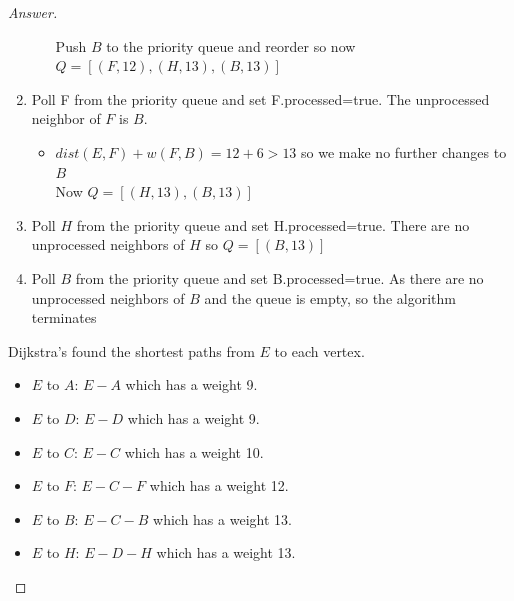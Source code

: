 \documentclass[11pt]{article}
\theoremstyle{definition}
\theoremstyle{definition}
\theoremstyle{definition}
\begin{document}
\begin{proof}[Answer]
\begin{enumerate}
\begin{itemize}
	Push $B$ to the priority queue and reorder so now $Q= [(F,12), (H,13), (B,13)]$
	\end{itemize}
\item Poll F from the priority queue and set F.processed=true. The unprocessed neighbor of $F$ is $B$.
	\begin{itemize}
	\item $dist(E,F) + w({F,B})= 12+6 > 13 $ so we make no further changes to $B$ \\
	Now $Q= [(H,13), (B,13)]$
	\end{itemize}
\item Poll $H$ from the priority queue and set H.processed=true. There are no unprocessed neighbors of $H$ so $Q= [(B,13)]$
\item Poll $B$ from the priority queue and set B.processed=true. As there are no unprocessed neighbors of $B$ and the queue is empty, so the algorithm terminates\\
\end{enumerate}
 Dijkstra's found the shortest paths from $E$ to each vertex.
		\begin{itemize}
		\item $E$ to $A$: $E-A$ which has a weight 9. 
		\item $E$ to $D$: $E-D$ which has a weight 9. 
		\item $E$ to $C$: $E-C$ which has a weight 10. 
		\item $E$ to $F$: $E-C-F$ which has a weight 12. 
		\item $E$ to $B$: $E-C-B$ which has a weight 13. 
		\item $E$ to $H$: $E-D-H$ which has a weight 13. 

		\end{itemize}

\end{proof}





\newpage
\end{document}
